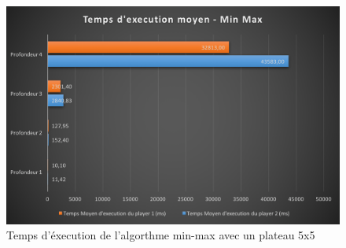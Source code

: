 \documentclass{report}
\begin{document}
	\begin{figure}[!t]
    	    \caption{Temps d'éxecution de l'algorthme min-max avec un plateau 5x5}
    	    \label{TEAMM5x5}
    	    \includegraphics[scale=0.40]{tempsExecutionMinMax5x5.png}
    	\end{figure}
	
	
\end{document}
